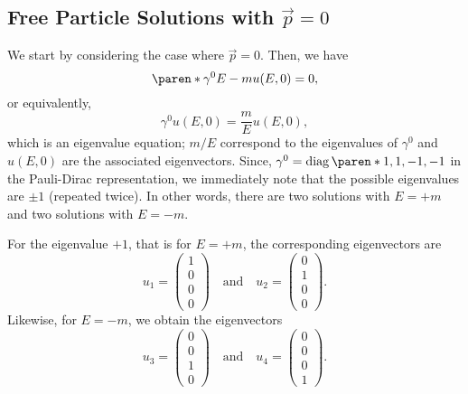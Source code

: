 \documentclass[11pt]{penrose}
\begin{document}
\subsection{Free Particle Solutions with \texorpdfstring{$\vec{p}=0$}{p=0}}
We start by considering the case where $\vec{p} = 0$. Then, we have
\begin{equation}
    \paren*{\gamma^0 E - m} u(E, 0) = 0,
\end{equation}
or equivalently,
\begin{equation}
    \gamma^0 u(E, 0) = \frac{m}{E} u(E, 0),
\end{equation}
which is an eigenvalue equation; $m/E$ correspond to the eigenvalues of $\gamma^0$ and $u(E, 0)$ are the associated eigenvectors. Since, $\gamma^0 = \diag\paren*{1,1,-1,-1}$ in the Pauli-Dirac representation, we immediately note that the possible eigenvalues are $\pm 1$ (repeated twice). In other words, there are two solutions with $E = +m$ and two solutions with $E = -m$.

For the eigenvalue $+1$, that is for $E = +m$, the corresponding eigenvectors are
\begin{equation}
    u_1 = \begin{pmatrix}1 \\ 0 \\ 0 \\ 0\end{pmatrix}
    \quad\text{and}\quad
    u_2 = \begin{pmatrix}0 \\ 1 \\ 0 \\ 0\end{pmatrix}.
\end{equation}
Likewise, for $E = -m$, we obtain the eigenvectors
\begin{equation}
    u_3 = \begin{pmatrix}0 \\ 0 \\ 1 \\ 0\end{pmatrix}
    \quad\text{and}\quad
    u_4 = \begin{pmatrix}0 \\ 0 \\ 0 \\ 1\end{pmatrix}.
\end{equation}
\end{document}
